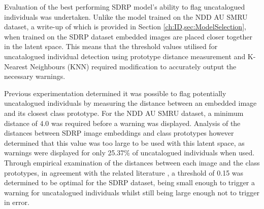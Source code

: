 Evaluation of the best performing SDRP model's ability to flag uncatalogued individuals was undertaken. Unlike the model trained on the NDD AU SMRU dataset, a write-up of which is provided in Section \ref{ch:ID,sec:ModelSelection}, when trained on the SDRP dataset embedded images are placed closer together in the latent space. This means that the threshold values utilised for uncatalogued individual detection using prototype distance measurement and K-Nearest Neighbours (KNN) required modification to accurately output the necessary warnings. 

Previous experimentation determined it was possible to flag potentially uncatalogued individuals by measuring the distance between an embedded image and its closest class prototype. For the NDD AU SMRU dataset, a minimum distance of 4.0 was required before a warning was displayed. Analysis of the distances between SDRP image embeddings and class prototypes however determined that this value was too large to be used with this latent space, as warnings were displayed for only 25.37\% of uncatalogued individuals when used. Through empirical examination of the distances between each image and the class prototypes, in agreement with the related literature \cite{battle_siamese_2022}, a threshold of 0.15 was determined to be optimal for the SDRP dataset, being small enough to trigger a warning for uncatalogued individuals whilst still being large enough not to trigger in error.

